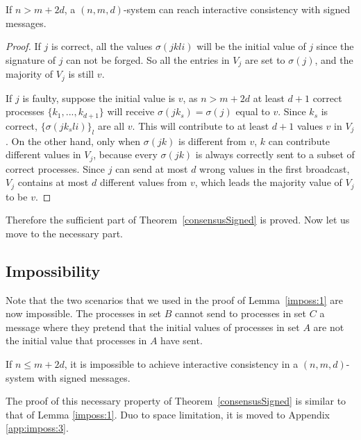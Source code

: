 \begin{lemma}
  If $n>m+2d$, a $(n,m,d)$-system can reach interactive consistency with signed
  messages.
\end{lemma}

\begin{proof}
  If $j$ is correct, all the values $\sigma ( j k l i )$ will be the
  initial value of $j$ since the signature of $j$ can not be forged. So all the entries in $V_j$ are set to $\sigma (j)$, and the majority of $V_{j}$ is still $v$.
  
  If $j$ is faulty, suppose the initial value is $v$, as $n>m+2d$ at least $d+1$
  correct processes $\{k_1,...,k_{d+1}\}$ will receive $\sigma( j  k_{s}) = \sigma(j)$ equal to $v$. Since $k_s$ is correct, $\{\sigma(j k_s l i)\}_l$ are all $v$. This
  will contribute to at least $d+1$ values $v$ in $V_{j}$. On the other
  hand, only when $\sigma ( j k )$ is different from
  $v$, $k$ can contribute different values in $V_{j}$, because every $\sigma(j k)$ is always correctly sent to a subset of correct processes. Since $j$ can send at
  most $d$ wrong values in the first broadcast, $V_{j}$ contains at most $d$
  different values from $v$, which leads the majority value of $V_{j}$ to be
  $v$.
\end{proof}

Therefore the sufficient part of Theorem~\ref{consensusSigned} is proved. Now let us move to the necessary part.

\subsection{Impossibility}

Note that the two scenarios that we used in the proof of Lemma~\ref{imposs:1}
are now impossible. The processes in set $B$ cannot send to processes in set $C$ a message 
where they pretend that the initial values of processes in set $A$ are not the initial value that processes in $A$ have sent.

\begin{lemma}\label{imposs:3}
  If $n \leqslant m+2d$, it is impossible to achieve interactive consistency in a $(n,m,d)$-system with signed messages.
\end{lemma}


The proof of this necessary property of Theorem~\ref{consensusSigned} is similar to that of Lemma \ref{imposs:1}. Duo to space limitation, it is moved to Appendix \ref{app:imposs:3}.
